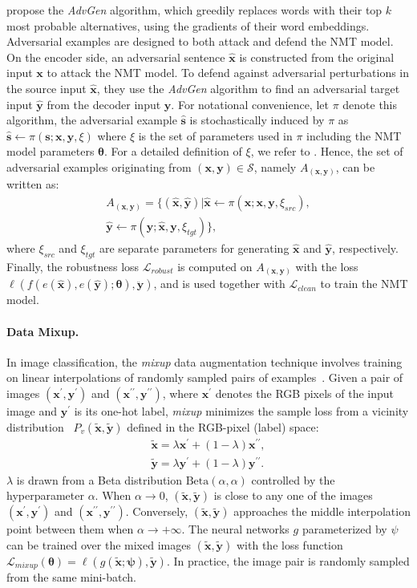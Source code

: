 \documentclass[11pt,a4paper]{article}
\def\S{\mathcal{S}} \def\cS{\vert \mathcal{S} \vert}
\def\bx{\mathbf{x}} \def\bxp{\mathbf{x}^{\prime}} \def\bxpp{\mathbf{x}^{\prime\prime}} \def\tbx{\tilde{\mathbf{x}}} \def\hbx{\hat{\mathbf{x}}} \def\ex{e(\mathbf{x})}
\def\by{\mathbf{y}} \def\byp{\mathbf{y}^{\prime}} \def\bypp{\mathbf{y}^{\prime\prime}} \def\tby{\tilde{\mathbf{y}}} \def\hby{\hat{\mathbf{y}}} \def\ey{e(\mathbf{y})}
\newcommand{\mixup}{\textit{mixup}\xspace}
\begin{document}
\citet{Cheng:19} propose the \emph{AdvGen} algorithm, which greedily replaces words with their top $k$ most probable alternatives, using the gradients of their word embeddings. 
Adversarial examples are designed to both attack and defend the NMT model. On the encoder side, an adversarial sentence $\hbx$ is constructed from the original input $\bx$ to attack the NMT model. To defend against adversarial perturbations in the source input $\hbx$, they use the \emph{AdvGen} algorithm to find an adversarial target input $\hby$ from the decoder input $\by$.
For notational convenience, let $\pi$ denote this algorithm, the adversarial example $\hat{\mathbf{s}}$ is stochastically induced by $\pi$ as $\hat{\mathbf{s}} \leftarrow \pi(\mathbf{s};\mathbf{x}, \mathbf{y}, \xi)$ where $\xi$ is the set of parameters used in $\pi$ including the NMT model parameters $\bm{\theta}$. For a detailed definition of $\xi$, we refer to \cite{Cheng:19}.
Hence, the set of adversarial examples originating from $(\bx,\by) \in \S$, namely $A_{(\mathbf{x}, \mathbf{y})}$, can be written as:
\begin{eqnarray}
A_{(\mathbf{x}, \mathbf{y})}=
\{
(\hbx, \hby)|
\hbx \leftarrow \pi(\bx;\bx, \by, \xi_{src}) \nonumber, \\
\hby \leftarrow \pi(\by;\hbx, \by, \xi_{tgt}) \}, \label{eq:adv_set}
\end{eqnarray}
where $\xi_{src}$ and $\xi_{tgt}$ are separate parameters for generating $\hbx$ and $\hby$, respectively. 
Finally, the robustness loss $\mathcal{L}_{robust}$ is computed on $A_{(\bx,\by)}$ with the loss $\ell(f(e(\hbx), e(\hby);\bm{\theta}), \ddot{\by})$, and is used together with $\mathcal{L}_{clean}$ to train the NMT model.

\paragraph{Data Mixup.}
In image classification, the \mixup data augmentation technique involves training on linear interpolations of randomly sampled pairs of examples~\cite{Zhang:18}.
Given a pair of images $(\bxp, \byp)$ and $(\bxpp, \bypp)$, where $\bxp$ denotes the RGB pixels of the input image and $\byp$ is its one-hot label, \mixup minimizes the sample loss from a vicinity distribution~\cite{chapelle2001vicinal} $P_v(\tilde{\mathbf{x}}, \tilde{\mathbf{y}}) $ defined in the RGB-pixel (label) space:
\begin{eqnarray}
\tbx = \lambda \bxp + (1 - \lambda) \bxpp, \\
\tby = \lambda \byp + (1 - \lambda) \bypp.
\end{eqnarray}
$\lambda$ is drawn from a Beta distribution $\text{Beta}(\alpha, \alpha)$ controlled by the hyperparameter $\alpha$.
When $\alpha \rightarrow 0$, $(\tbx, \tby)$ is close to any one of the images $(\bxp, \byp)$ and $(\bxpp, \bypp)$.
Conversely, $(\tbx, \tby)$ approaches the middle interpolation point between them when $\alpha \rightarrow  + \infty$. 
The neural networks $g$ parameterized by $\psi$ can be trained over the mixed images $(\tbx, \tby)$ with the loss function
$\mathcal{L}_{mixup}(\bm{\theta}) = \ell(g(\tilde{\bx};\bm{\psi}), \tilde{\by})$. In practice, the image pair is randomly sampled from the same mini-batch.
\end{document}
